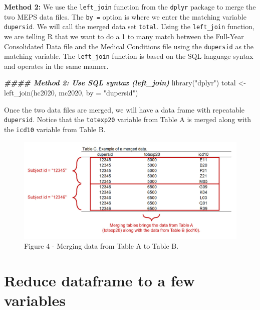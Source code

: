 \documentclass[
]{book}
\newenvironment{Shaded}{\begin{snugshade}}{\end{snugshade}}
\newcommand{\AttributeTok}[1]{\textcolor[rgb]{0.77,0.63,0.00}{#1}}
\newcommand{\DocumentationTok}[1]{\textcolor[rgb]{0.56,0.35,0.01}{\textbf{\textit{#1}}}}
\newcommand{\FunctionTok}[1]{\textcolor[rgb]{0.00,0.00,0.00}{#1}}
\newcommand{\NormalTok}[1]{#1}
\newcommand{\OtherTok}[1]{\textcolor[rgb]{0.56,0.35,0.01}{#1}}
\newcommand{\StringTok}[1]{\textcolor[rgb]{0.31,0.60,0.02}{#1}}
\theoremstyle{definition}
\theoremstyle{definition}
\theoremstyle{definition}
\theoremstyle{definition}
\theoremstyle{remark}
\begin{document}
\textbf{Method 2:} We use the \texttt{left\_join} function from the \texttt{dplyr} package to merge the two MEPS data files. The \texttt{by\ =} option is where we enter the matching variable \texttt{dupersid}. We will call the merged data set \texttt{total}. Using the \texttt{left\_join} function, we are telling R that we want to do a 1 to many match between the Full-Year Consolidated Data file and the Medical Conditions file using the \texttt{dupersid} as the matching variable. The \texttt{left\_join} function is based on the SQL language syntax and operates in the same manner.

\begin{Shaded}
\begin{Highlighting}[]
\DocumentationTok{\#\#\#\# Method 2: Use SQL syntax (left\_join)}
\FunctionTok{library}\NormalTok{(}\StringTok{"dplyr"}\NormalTok{)}
\NormalTok{total }\OtherTok{\textless{}{-}} \FunctionTok{left\_join}\NormalTok{(hc2020, mc2020, }\AttributeTok{by =} \StringTok{"dupersid"}\NormalTok{)}
\end{Highlighting}
\end{Shaded}

Once the two data files are merged, we will have a data frame with repeatable \texttt{dupersid}. Notice that the \texttt{totexp20} variable from Table A is merged along with the \texttt{icd10} variable from Table B.

\begin{figure}
\includegraphics[width=1\linewidth]{Figure 2_4} \caption{Figure 4 - Merging data from Table A to Table B.}\label{fig:unnamed-chunk-15}
\end{figure}

\hypertarget{reduce-dataframe-to-a-few-variables}{%
\section{Reduce dataframe to a few variables}\label{reduce-dataframe-to-a-few-variables}}
\end{document}
